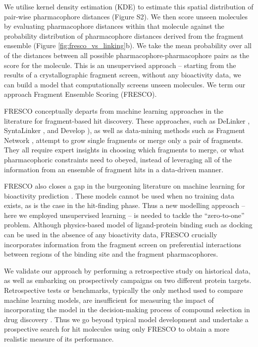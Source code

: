 
We utilise kernel density estimation (KDE) \cite{Parzen1962KDE} to estimate this spatial distribution of pair-wise pharmacophore distances (Figure S2). We then score unseen molecules by evaluating pharmacophore distances within that molecule against the probability distribution of pharmacophore distances derived from the fragment ensemble (Figure \ref{fig:fresco_vs_linking}b). We take the mean probability over all of the distances between all possible pharmacophore-pharmacophore pairs as the score for the molecule. This is an unsupervised approach -- starting from the results of a crystallographic fragment screen, without any bioactivity data, we can build a model that computationally screens unseen molecules. We term our approach Fragment Ensemble Scoring (FRESCO). 

FRESCO conceptually departs from machine learning approaches in the literature for fragment-based hit discovery. These approaches, such as DeLinker \cite{Imrie2020DeLinker},  SyntaLinker \cite{Yang2020SyntaLinker}, and Develop \cite{Imrie2021Develop}), as well as data-mining methods such as Fragment Network \cite{Hall2017FragNet}, attempt to grow single fragments or merge only a pair of fragments. They all require expert insights in choosing which fragments to merge, or what pharmacophoric constraints need to obeyed, instead of leveraging all of the information from an ensemble of fragment hits in a data-driven manner.

FRESCO also closes a gap in the burgeoning literature on machine learning for bioactivity prediction \cite{muratov2020qsar}. These models cannot be used when no training data exists, as is the case in the hit-finding phase. Thus a new modelling approach -- here we employed unsupervised learning -- is needed to tackle the ``zero-to-one'' problem. Although physics-based model of ligand-protein binding such as docking \cite{Lyu2019ultra, Alon2021sigma, Fink2022Alpha} can be used in the absence of any bioactivity data, FRESCO crucially incorporates information from the fragment screen on preferential interactions between regions of the binding site and the fragment pharmacophores.

We validate our approach by performing a retrospective study on historical data, as well as embarking on prospectively campaigns on two different protein targets. Retrospective tests or benchmarks, typically the only method used to compare machine learning models, are insufficient for measuring the impact of incorporating the model in the decision-making process of compound selection in drug discovery \cite{Kearnes2021Prospective}. Thus we go beyond typical model development and undertake a prospective search for hit molecules using only FRESCO to obtain a more realistic measure of its performance.

